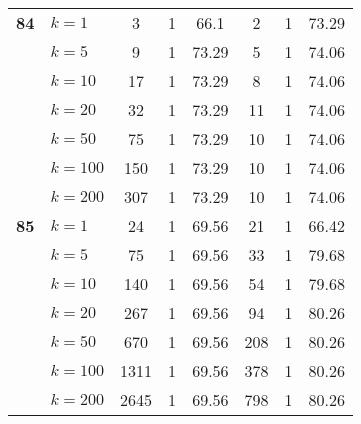 \begin{table}[htbp]
\begin{tabular}{|l|l|c|c|c|c|c|c|}
    \multicolumn{1}{|r|}{\textbf{84}} & $k=1$ & 3 & 1 & 66.1 & 2 & 1 & 73.29 \\ 
     & $k=5$ & 9 & 1 & 73.29 & 5 & 1 & 74.06 \\ 
     & $k=10$ & 17 & 1 & 73.29 & 8 & 1 & 74.06 \\ 
     & $k=20$ & 32 & 1 & 73.29 & 11 & 1 & 74.06 \\ 
     & $k=50$ & 75 & 1 & 73.29 & 10 & 1 & 74.06 \\ 
     & $k=100$ & 150 & 1 & 73.29 & 10 & 1 & 74.06 \\ 
     & $k=200$ & 307 & 1 & 73.29 & 10 & 1 & 74.06 \\ \hline
    \multicolumn{1}{|r|}{\textbf{85}} & $k=1$ & 24 & 1 & 69.56 & 21 & 1 & 66.42 \\ 
     & $k=5$ & 75 & 1 & 69.56 & 33 & 1 & 79.68 \\ 
     & $k=10$ & 140 & 1 & 69.56 & 54 & 1 & 79.68 \\ 
     & $k=20$ & 267 & 1 & 69.56 & 94 & 1 & 80.26 \\ 
     & $k=50$ & 670 & 1 & 69.56 & 208 & 1 & 80.26 \\ 
     & $k=100$ & 1311 & 1 & 69.56 & 378 & 1 & 80.26 \\ 
     & $k=200$ & 2645 & 1 & 69.56 & 798 & 1 & 80.26 \\ \hline
    \end{tabular}
\end{table}
